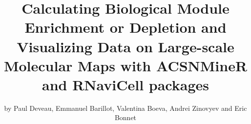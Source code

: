 
\author{by Paul Deveau, Emmanuel Barillot, Valentina Boeva, Andrei Zinovyev and Eric Bonnet} %
\title{Calculating Biological Module Enrichment or Depletion and Visualizing Data on Large-scale Molecular Maps with ACSNMineR and RNaviCell packages} %
\maketitle


